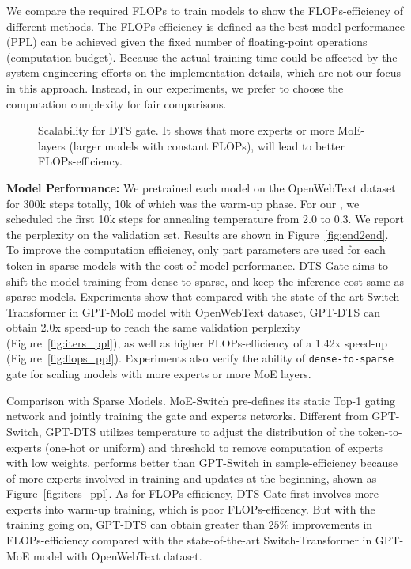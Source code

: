 We compare the required FLOPs to train models to show the FLOPs-efficiency of different methods.
The FLOPs-efficiency is defined as the best model performance (PPL) can be achieved given the fixed number of floating-point operations (computation budget).
Because the actual training time could be affected by the system engineering efforts on the implementation details, which are not our focus in this approach. Instead, in our experiments, we prefer to choose the computation complexity for fair comparisons. 

\begin{figure*}[t]
    \centering
    \caption{Scalability for DTS gate. It shows that more experts or more MoE-layers (larger models with constant FLOPs), will lead to better FLOPs-efficiency.
    }
    \label{fig:scalability}
\end{figure*}

\textbf{Model Performance:}
We pretrained each model on the OpenWebText dataset for 300k steps totally, 10k of which was the warm-up phase. For our \ourmethods{}, we scheduled the first 10k steps for annealing temperature from 2.0 to 0.3. We report the perplexity on the validation set. Results are shown in Figure~\ref{fig:end2end}.
To improve the computation efficiency, only part parameters are used for each token in sparse models with the cost of model performance. 
DTS-Gate aims to shift the model training from dense to sparse, and keep the inference cost same as sparse models.
Experiments show that compared with the state-of-the-art Switch-Transformer in GPT-MoE model with OpenWebText dataset, GPT-DTS can obtain
2.0x speed-up to reach the same validation perplexity (Figure~\ref{fig:iters_ppl}), as well as higher FLOPs-efficiency of a 1.42x speed-up (Figure~\ref{fig:flops_ppl}).
Experiments also verify the ability of \texttt{dense-to-sparse} gate for scaling models with more experts or more MoE layers.

Comparison with Sparse Models.
MoE-Switch pre-defines its static Top-1 gating network and jointly training the gate and experts networks. Different from GPT-Switch, GPT-DTS utilizes temperature to adjust the distribution of the token-to-experts (one-hot or uniform) and threshold to remove computation of experts with low weights. \ourmethods{} performs better than GPT-Switch in sample-efficiency because of more experts involved in training and updates at the beginning, shown as Figure~\ref{fig:iters_ppl}. As for FLOPs-efficiency, DTS-Gate first involves more experts into warm-up training, which is poor FLOPs-efficency. But with the training going on, GPT-DTS can obtain greater than $25\%$ improvements in FLOPs-efficiency compared with the state-of-the-art Switch-Transformer in GPT-MoE model with OpenWebText dataset.

